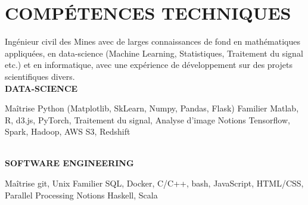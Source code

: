 \documentclass[]{cv-style}
\begin{document}
\section{COMPÉTENCES TECHNIQUES}
\vspace{-0.3cm}
%
Ingénieur civil des Mines avec de larges connaissances de fond en mathématiques 
appliquées, en data-science (Machine Learning, Statistiques, Traitement du
signal etc.) et en informatique, avec une expérience de développement sur des
projets scientifiques divers. \\[0.1cm]
\textbf{DATA-SCIENCE} \\[0.1cm]
\begin{entrylist}
%
\entry
{Maîtrise}
{{\normalfont Python (Matplotlib, SkLearn, Numpy, Pandas, Flask)}}
{}{\vspace{-0.5cm}}
%
\entry
{Familier}
{{\normalfont Matlab, R, d3.js, PyTorch, Traitement du signal, Analyse d'image}}
{}{\vspace{-0.5cm}}
%
\entry
{Notions}
{{\normalfont Tensorflow, Spark, Hadoop, AWS S3, Redshift}}{}{}
%
\end{entrylist}
\vspace{-0.5cm}\\
\textbf{SOFTWARE ENGINEERING} \\[0.1cm]
\begin{entrylist}
%
\entry
{Maîtrise}
{{\normalfont git, Unix}}
{}{\vspace{-0.5cm}}
%
\entry
{Familier}
{{\normalfont SQL, Docker, C/C++, bash, JavaScript, HTML/CSS, Parallel 
Processing}}
{}{\vspace{-0.5cm}}
%
\entry
{Notions}
{{\normalfont Haskell, Scala}}{}{\vspace{-0.5cm}}
%
\end{entrylist}
\end{document}
